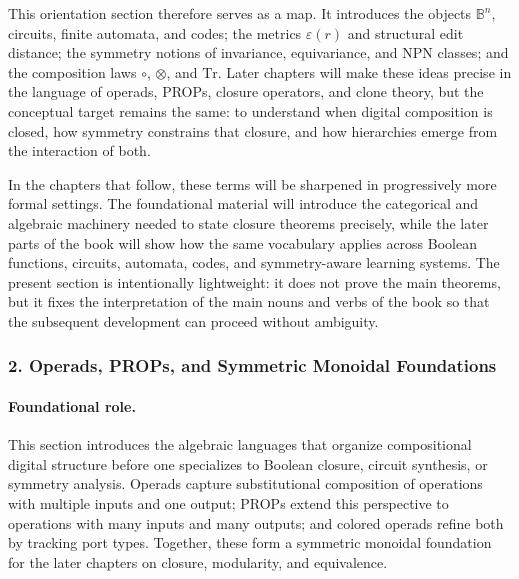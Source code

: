 \documentclass[11pt]{article}
\begin{document}
This orientation section therefore serves as a map. It introduces the objects \(\mathbb{B}^n\), circuits, finite automata, and codes; the metrics \(\varepsilon(r)\) and structural edit distance; the symmetry notions of invariance, equivariance, and \(\mathrm{NPN}\) classes; and the composition laws \(\circ\), \(\otimes\), and \(\mathrm{Tr}\). Later chapters will make these ideas precise in the language of operads, PROPs, closure operators, and clone theory, but the conceptual target remains the same: to understand when digital composition is closed, how symmetry constrains that closure, and how hierarchies emerge from the interaction of both.

In the chapters that follow, these terms will be sharpened in progressively more formal settings. The foundational material will introduce the categorical and algebraic machinery needed to state closure theorems precisely, while the later parts of the book will show how the same vocabulary applies across Boolean functions, circuits, automata, codes, and symmetry-aware learning systems. The present section is intentionally lightweight: it does not prove the main theorems, but it fixes the interpretation of the main nouns and verbs of the book so that the subsequent development can proceed without ambiguity.



\subsubsection{2. Operads, PROPs, and Symmetric Monoidal Foundations}


\paragraph{Foundational role.}
This section introduces the algebraic languages that organize compositional digital structure before one specializes to Boolean closure, circuit synthesis, or symmetry analysis. Operads capture substitutional composition of operations with multiple inputs and one output; PROPs extend this perspective to operations with many inputs and many outputs; and colored operads refine both by tracking port types. Together, these form a symmetric monoidal foundation for the later chapters on closure, modularity, and equivalence.
\end{document}
